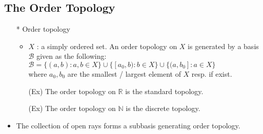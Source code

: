 \documentclass[12pt]{article}
\newcommand{\Nat}{\mathbb{N}}
\newcommand{\Real}{\mathbb{R}}
\begin{document}
\subsection{The Order Topology}	
\smallskip
\begin{itemize}
	\item[*]Order topology
	\begin{itemize}
		\item $X$ : a simply ordered set. An order topology on $X$ is generated by a basis $\mathcal{B}$ given as the following:
		 $\mathcal{B}=\{(a,b):  a,b\in X\}\cup\{[a_0,b): b\in X\}\cup\{(a,b_0]: a\in X\}$
		\\where $a_0, b_0$ are the smallest / largest element of $X$ resp. if exist.
		\item[(Ex)] The order topology on $\Real$ is the standard topology.
		\item[(Ex)] The order topology on $\Nat$ is the discrete topology.
	\end{itemize}
	\item The collection of open rays forms a subbasis generating order topology.
\end{itemize}	
\bigskip
\end{document}
